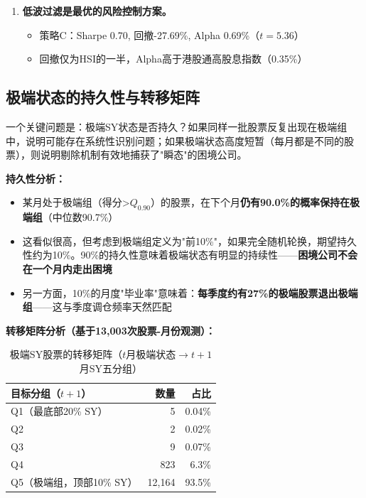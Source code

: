 \documentclass[10pt,a4paper]{ctexart}
\begin{document}
\begin{enumerate}[label=\textbf{发现\arabic*：}, leftmargin=*]
    \item \textbf{低波过滤是最优的风险控制方案。}
    \begin{itemize}
        \item 策略C：Sharpe 0.70, 回撤-27.69\%, Alpha 0.69\%（$t=5.36$）
        \item 回撤仅为HSI的一半，Alpha高于港股通高股息指数（0.35\%）
    \end{itemize}
\end{enumerate}

\subsection{极端状态的持久性与转移矩阵}

一个关键问题是：极端SY状态是否持久？如果同样一批股票反复出现在极端组中，说明可能存在系统性识别问题；如果极端状态高度短暂（每月都是不同的股票），则说明剔除机制有效地捕获了"瞬态"的困境公司。

\textbf{持久性分析：}

\begin{itemize}
    \item 某月处于极端组（得分>$Q_{0.90}$）的股票，在下个月\textbf{仍有90.0\%的概率保持在极端组}（中位数90.7\%）
    \item 这看似很高，但考虑到极端组定义为"前10\%"，如果完全随机轮换，期望持久性约为10\%。90\%的持久性意味着极端状态有明显的持续性——\textbf{困境公司不会在一个月内走出困境}
    \item 另一方面，10\%的月度"毕业率"意味着：\textbf{每季度约有27\%的极端股票退出极端组}——这与季度调仓频率天然匹配
\end{itemize}

\textbf{转移矩阵分析（基于13,003次股票-月份观测）：}

\begin{table}[htbp]
\centering
\caption{极端SY股票的转移矩阵（$t$月极端状态$\rightarrow t+1$月SY五分组）}
\begin{tabular}{lrr}
\toprule
\textbf{目标分组（$t+1$）} & \textbf{数量} & \textbf{占比} \\
\midrule
Q1（最底部20\% SY） & 5 & 0.04\% \\
Q2 & 2 & 0.02\% \\
Q3 & 9 & 0.07\% \\
Q4 & 823 & 6.3\% \\
Q5（极端组，顶部10\% SY） & 12,164 & 93.5\% \\
\bottomrule
\end{tabular}
\end{table}
\end{document}
